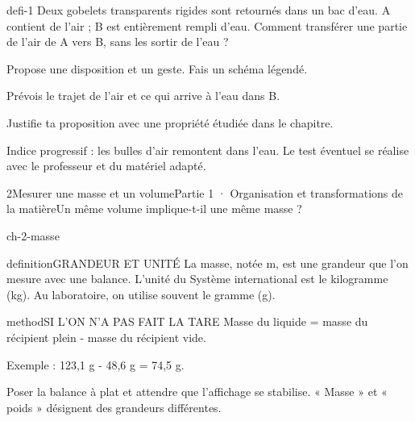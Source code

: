 \documentclass[12pt,twoside,openany]{book}
\begin{document}
\begin{pcFiche}{defi-1}
Deux gobelets transparents rigides sont retournés dans un bac d’eau. A contient de l’air ; B est entièrement rempli d’eau. Comment transférer une partie de l’air de A vers B, sans les sortir de l’eau ?\par
{}
\begin{questions}
\item Propose une disposition et un geste. Fais un schéma légendé.
\item Prévois le trajet de l’air et ce qui arrive à l’eau dans B.
\item Justifie ta proposition avec une propriété étudiée dans le chapitre.
\end{questions}
Indice progressif : les bulles d’air remontent dans l’eau. Le test éventuel se réalise avec le professeur et du matériel adapté.\par
\end{pcFiche}
\clearpage\pagestyle{otMain}
\begin{ouverture}[college1]{2}{Mesurer une masse et un volume}{Partie 1 · Organisation et transformations de la matière}{Un même volume implique-t-il une même masse ?}
\end{ouverture}
\label{ch-2-masse}
\label{ess-2}
\begin{pcFiche}{ch-2-masse}
\begin{pcEncadre}{definition}{GRANDEUR ET UNITÉ}
La masse, notée m, est une grandeur que l’on mesure avec une balance. L’unité du Système international est le kilogramme (kg). Au laboratoire, on utilise souvent le gramme (g).\par
\end{pcEncadre}
\begin{pcEncadre}{method}{SI L’ON N’A PAS FAIT LA TARE}
Masse du liquide = masse du récipient plein - masse du récipient vide.\par Exemple : 123,1 g - 48,6 g = 74,5 g.\par
\end{pcEncadre}
Poser la balance à plat et attendre que l’affichage se stabilise. « Masse » et « poids » désignent des grandeurs différentes.\par
\end{pcFiche}
\end{document}
